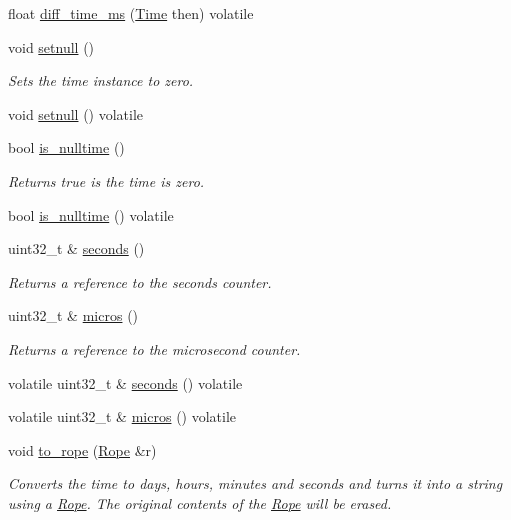 \begin{DoxyCompactItemize}
float \hyperlink{classetk_1_1_time_a5b6ff1f04babfb9f93e05a7b46291e22}{diff\-\_\-time\-\_\-ms} (\hyperlink{classetk_1_1_time}{Time} then) volatile
\item 
void \hyperlink{classetk_1_1_time_ab38fb137fe9e0477c2dcc4eae12d05c9}{setnull} ()
\begin{DoxyCompactList}\small\item\em Sets the time instance to zero. \end{DoxyCompactList}\item 
void \hyperlink{classetk_1_1_time_af0d9e8da96c5eb92811a6ec239b9ffa5}{setnull} () volatile
\item 
bool \hyperlink{classetk_1_1_time_a1728c210b6e053548d5de2d7b8fd91f4}{is\-\_\-nulltime} ()
\begin{DoxyCompactList}\small\item\em Returns true is the time is zero. \end{DoxyCompactList}\item 
bool \hyperlink{classetk_1_1_time_ad04d01890c9d5519966532873aa54255}{is\-\_\-nulltime} () volatile
\item 
uint32\-\_\-t \& \hyperlink{classetk_1_1_time_a51388ad1289ac984074d749d9330819c}{seconds} ()
\begin{DoxyCompactList}\small\item\em Returns a reference to the seconds counter. \end{DoxyCompactList}\item 
uint32\-\_\-t \& \hyperlink{classetk_1_1_time_a8418daa8bc3519fd50ffc054cb1da9dc}{micros} ()
\begin{DoxyCompactList}\small\item\em Returns a reference to the microsecond counter. \end{DoxyCompactList}\item 
volatile uint32\-\_\-t \& \hyperlink{classetk_1_1_time_aebf5be4e8b668e13b468ee03c3e9460f}{seconds} () volatile
\item 
volatile uint32\-\_\-t \& \hyperlink{classetk_1_1_time_adf23386c14142fde9f0f965a75aed936}{micros} () volatile
\item 
void \hyperlink{classetk_1_1_time_af0fabd9a7c37abd196d6c4ea480c7aa4}{to\-\_\-rope} (\hyperlink{classetk_1_1_rope}{Rope} \&r)
\begin{DoxyCompactList}\small\item\em Converts the time to days, hours, minutes and seconds and turns it into a string using a \hyperlink{classetk_1_1_rope}{Rope}. The original contents of the \hyperlink{classetk_1_1_rope}{Rope} will be erased. \end{DoxyCompactList}\end{DoxyCompactItemize}
